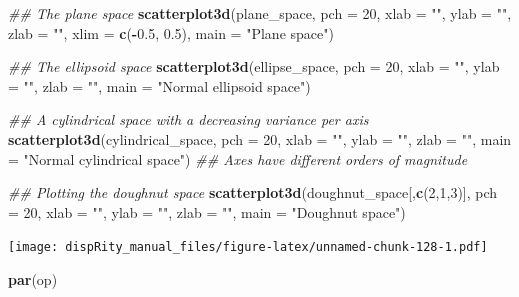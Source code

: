 \documentclass[]{book}
\newenvironment{Shaded}{\begin{snugshade}}{\end{snugshade}}
\newcommand{\CommentTok}[1]{\textcolor[rgb]{0.56,0.35,0.01}{\textit{#1}}}
\newcommand{\DataTypeTok}[1]{\textcolor[rgb]{0.13,0.29,0.53}{#1}}
\newcommand{\DecValTok}[1]{\textcolor[rgb]{0.00,0.00,0.81}{#1}}
\newcommand{\FloatTok}[1]{\textcolor[rgb]{0.00,0.00,0.81}{#1}}
\newcommand{\KeywordTok}[1]{\textcolor[rgb]{0.13,0.29,0.53}{\textbf{#1}}}
\newcommand{\NormalTok}[1]{#1}
\newcommand{\OperatorTok}[1]{\textcolor[rgb]{0.81,0.36,0.00}{\textbf{#1}}}
\newcommand{\StringTok}[1]{\textcolor[rgb]{0.31,0.60,0.02}{#1}}
\begin{document}
\begin{Shaded}
\begin{Highlighting}[]
\CommentTok{## The plane space}
\KeywordTok{scatterplot3d}\NormalTok{(plane_space, }\DataTypeTok{pch =} \DecValTok{20}\NormalTok{, }\DataTypeTok{xlab =} \StringTok{""}\NormalTok{, }\DataTypeTok{ylab =} \StringTok{""}\NormalTok{, }\DataTypeTok{zlab =} \StringTok{""}\NormalTok{,}
              \DataTypeTok{xlim =} \KeywordTok{c}\NormalTok{(}\OperatorTok{-}\FloatTok{0.5}\NormalTok{, }\FloatTok{0.5}\NormalTok{), }\DataTypeTok{main =} \StringTok{"Plane space"}\NormalTok{)}

\CommentTok{## The ellipsoid space}
\KeywordTok{scatterplot3d}\NormalTok{(ellipse_space, }\DataTypeTok{pch =} \DecValTok{20}\NormalTok{, }\DataTypeTok{xlab =} \StringTok{""}\NormalTok{, }\DataTypeTok{ylab =} \StringTok{""}\NormalTok{, }\DataTypeTok{zlab =} \StringTok{""}\NormalTok{,}
              \DataTypeTok{main =} \StringTok{"Normal ellipsoid space"}\NormalTok{)}

\CommentTok{## A cylindrical space with a decreasing variance per axis}
\KeywordTok{scatterplot3d}\NormalTok{(cylindrical_space, }\DataTypeTok{pch =} \DecValTok{20}\NormalTok{, }\DataTypeTok{xlab =} \StringTok{""}\NormalTok{, }\DataTypeTok{ylab =} \StringTok{""}\NormalTok{, }\DataTypeTok{zlab =} \StringTok{""}\NormalTok{,}
              \DataTypeTok{main =} \StringTok{"Normal cylindrical space"}\NormalTok{)}
\CommentTok{## Axes have different orders of magnitude}

\CommentTok{## Plotting the doughnut space}
\KeywordTok{scatterplot3d}\NormalTok{(doughnut_space[,}\KeywordTok{c}\NormalTok{(}\DecValTok{2}\NormalTok{,}\DecValTok{1}\NormalTok{,}\DecValTok{3}\NormalTok{)], }\DataTypeTok{pch =} \DecValTok{20}\NormalTok{, }\DataTypeTok{xlab =} \StringTok{""}\NormalTok{, }\DataTypeTok{ylab =} \StringTok{""}\NormalTok{,}
              \DataTypeTok{zlab =} \StringTok{""}\NormalTok{, }\DataTypeTok{main =} \StringTok{"Doughnut space"}\NormalTok{)}
\end{Highlighting}
\end{Shaded}

\texttt{[image: dispRity\_manual\_files/figure-latex/unnamed-chunk-128-1.pdf]}

\begin{Shaded}
\begin{Highlighting}[]
\KeywordTok{par}\NormalTok{(op)}
\end{Highlighting}
\end{Shaded}
\end{document}
